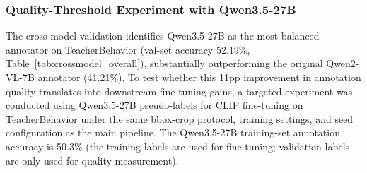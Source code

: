 \documentclass{ieeeaccess}
\begin{document}
\begin{table}[!ht]
\caption{Ten-model cross-model validation on four key TeacherBehavior
categories illustrating the capability boundary (\textit{guide}) and the
task-level constraint (\textit{answer}).
Values are validation-set bbox-level accuracy (\%).
$n$ = number of validation crops.
Q3.6-27B values sourced from log files (result directory lost).}
\label{tab:crossmodel_intent}
\centering
\scriptsize
{}
\normalsize
\end{table}

\subsubsection{Quality-Threshold Experiment with Qwen3.5-27B}

The cross-model validation identifies Qwen3.5-27B as the most balanced
annotator on TeacherBehavior (val-set accuracy 52.19\%, Table~\ref{tab:crossmodel_overall}),
substantially outperforming the original Qwen2-VL-7B annotator (41.21\%).
To test whether this 11pp improvement in annotation quality translates
into downstream fine-tuning gains, a targeted experiment was conducted
using Qwen3.5-27B pseudo-labels for CLIP fine-tuning on TeacherBehavior
under the same bbox-crop protocol, training settings, and seed
configuration as the main pipeline.
The Qwen3.5-27B training-set annotation accuracy is 50.3\% (the training
labels are used for fine-tuning; validation labels are only used for
quality measurement).
\end{document}
